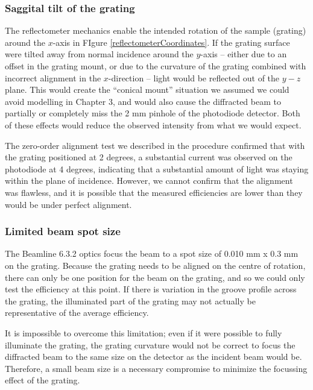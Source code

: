 \subsubsection{Saggital tilt of the grating}
The reflectometer mechanics enable the intended rotation of the sample (grating) around the $x$-axis in FIgure \ref{reflectometerCoordinates}.  If the grating surface were tilted away from normal incidence around the $y$-axis -- either due to an offset in the grating mount, or due to the curvature of the grating combined with incorrect alignment in the $x$-direction -- light would be reflected out of the $y-z$ plane.  This would create the ``conical mount'' situation we assumed we could avoid modelling in Chapter 3, and would also cause the diffracted beam to partially or completely miss the 2 mm pinhole of the photodiode detector.  Both of these effects would reduce the observed intensity from what we would expect.

The zero-order alignment test we described in the procedure confirmed that with the grating positioned at 2 degrees, a substantial current was observed on the photodiode at 4 degrees, indicating that a substantial amount of light was staying within the plane of incidence.  However, we cannot confirm that the alignment was flawless, and it is possible that the measured efficiencies are lower than they would be under perfect alignment.

\subsubsection{Limited beam spot size}
The Beamline 6.3.2 optics focus the beam to a spot size of 0.010 mm x 0.3 mm on the grating.  
Because the grating needs to be aligned on the centre of rotation, there can only be one position for the beam on the grating, and so we could only test the efficiency at this point.  If there is variation in the groove profile across the grating, the illuminated part of the grating may not actually be representative of the average efficiency.  

It is impossible to overcome this limitation; even if it were possible to fully illuminate the grating, the grating curvature would not be correct to focus the diffracted beam to the same size on the detector as the incident beam would be.  Therefore, a small beam size is a necessary compromise to minimize the focussing effect of the grating.


